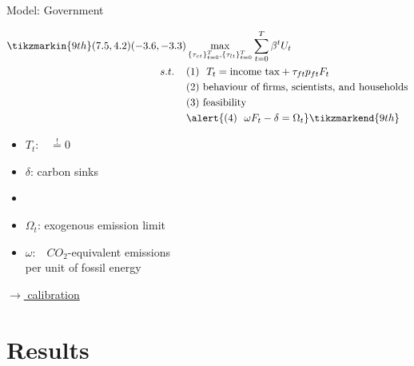 \documentclass[11pt,aspectratio=169]{beamer}
\begin{document}
\addtocounter{framenumber}{-1}
\begin{frame}{Model: Government}
\begin{minipage}[t!]{1\textwidth}
	\begin{align*}
	\tikzmarkin{9th}(7.5,4.2)(-3.6,-3.3)
&\max_{\{\tau_{ct}\}_{t=0}^{T}, \{\tau_{lt}\}_{t=0}^{T}} \sum_{t=0}^{T}\beta^t U_{t}\\
s.t. \hspace{4mm}
&(1)\ \ T_t= \text{income tax}+\tau_{ft}p_{ft}F_{t}\\
& (2)\ \text{behaviour of firms, scientists, and households}\\
& (3)\ \text{feasibility} \\
&\alert{
(4)\ \  \omega F_t-\delta =\Omega_t }
	\tikzmarkend{9th}
	\end{align*}
\end{minipage}

\small
\vspace{0mm}
\begin{minipage}[t!]{0.35\textwidth}
\vspace{7mm}
\begin{itemize}
	\item[] $T_t$:\ \ $\overset{!}{=}0$  \vspace{0mm}
	\item[] $\delta$: carbon sinks\vspace{-2mm}
	\item[] 
\end{itemize}
\end{minipage}
\begin{minipage}[t!]{0.6\textwidth}
\vspace{8mm}
\begin{itemize}
	\item[] $\Omega_{t}$: exogenous emission limit
	\vspace{0mm}	
		\item[] $\omega$:\ \ $CO_2$-equivalent emissions \\ \hspace{4mm} per unit of fossil energy
\end{itemize}
\end{minipage}

	\vspace{0mm}
\hfill
\hyperlink{calib}{\tiny{$\rightarrow$ calibration}} 
\end{frame}


\hypertarget{resback}{}
\section{Results}
\end{document}
